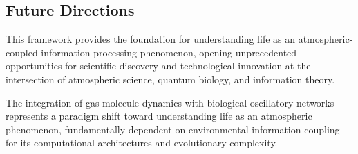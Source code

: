 \documentclass[twocolumn]{article}
\begin{document}
\subsection{Future Directions}

This framework provides the foundation for understanding life as an atmospheric-coupled information processing phenomenon, opening unprecedented opportunities for scientific discovery and technological innovation at the intersection of atmospheric science, quantum biology, and information theory.

The integration of gas molecule dynamics with biological oscillatory networks represents a paradigm shift toward understanding life as an atmospheric phenomenon, fundamentally dependent on environmental information coupling for its computational architectures and evolutionary complexity.
\end{document}
